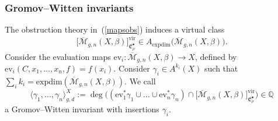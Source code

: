 \documentclass[pdftex]{sigma}
\numberwithin{equation}{section}
\newcommand{\vv}{\mathrm{vir}}
\newcommand{\E}{\mathfrak E}
\theoremstyle{plain}
\theoremstyle{definition}
\theoremstyle{remark}
\begin{document}
\subsubsection{Gromov--Witten invariants}The obstruction theory in~(\ref{mapsobs}) induces a virtual class
\[
\big[\overline{\mathcal{M}}_{g,n}(X,\beta)\big]^{\vv}_{\E^{\bullet}_{\rho}}\in A_{\mathrm{expdim}}\big(\overline{\mathcal{M}}_{g,n}(X,\beta)\big).
\]
Consider the evaluation maps $\mathrm{ev}_i\colon \overline{\mathcal{M}}_{g,n}(X,\beta)\to X$, defined by $\mathrm{ev}_i(C, x_1,\dots,x_n,f)=f(x_i)$.
Consider $\gamma_i\in A^{k_i}(X)$ such that $\sum_i{k_i}=\mathrm{expdim}(\overline{\mathcal{M}}_{g,n}(X,\beta))$. We call
\[
\langle \gamma_1,\ldots,\gamma_n\rangle^X_{g,d}:=\deg\big(( \mathrm{ev}_1^*\gamma_1\cup\dots\cup \mathrm{ev}_n^*\gamma_n)\cap \big[\overline{\mathcal{M}}_{g,n}(X,\beta)\big]^{\vv}_{\E^{\bullet}_{\rho}}\big)\in \mathbb{Q}
\]
a Gromov--Witten invariant with insertions $\gamma_i$.
\end{document}
